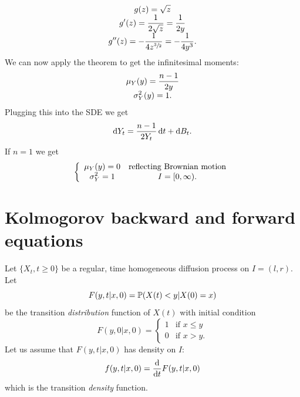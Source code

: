 \documentclass[12pt]{report}
\begin{document}
\begin{enumerate}
\begin{equation*}
\begin{array}{>{\displaystyle}c}
			g(z)=\sqrt{z}\\
			g'(z)=\frac{1}{2\sqrt{z}}=\frac{1}{2y}\\
			g''(z)=-\frac{1}{4z^{\sfrac{3}{2}}}=-\frac{1}{4y^{3}}.
		\end{array}
	\end{equation*}
	We can now apply the theorem to get the infinitesimal moments:
	\begin{equation*}
		\begin{array}{>{\displaystyle}c}
			\mu_{Y}(y)=\frac{n-1}{2y}\\
			\sigma^{2}_{Y}(y)=1.
		\end{array}
	\end{equation*}
	Plugging this into the SDE we get
	\begin{equation*}
		\mathop{}\!\mathrm{d} Y_{t}=\frac{n-1}{2Y_{t}}\mathop{}\!\mathrm{d} t+\mathop{}\!\mathrm{d} B_{t}.
	\end{equation*}
	If $n=1$ we get
	\begin{equation*}
		\left\{\begin{array}{*2{>{\displaystyle}c}}
			\mu_{Y}(y)=0&\text{reflecting \bwm}\\
			\sigma^{2}_{Y}=1&I=[0,\infty).
		\end{array}\right.
	\end{equation*}
\end{enumerate}
\section{Kolmogorov backward and forward equations}
Let $\{X_{t},t\geq 0\}$ be a regular, time homogeneous diffusion process on $I=(l,r)$. Let
\begin{equation*}
	F(y,t|x,0)=\mathbb{P}(X(t)<y|X(0)=x)
\end{equation*}
be the transition \textit{distribution} function of $X(t)$ with initial condition
\begin{equation*}
	F(y,0|x,0)=\begin{cases}
		1&\text{if }x\leq y\\
		0&\text{if }x>y.
	\end{cases}
\end{equation*}
Let us assume that $F(y,t|x,0)$ has density on $I$:
\begin{equation*}
	f(y,t|x,0)=\frac{\mathop{}\!\mathrm{d}}{\mathop{}\!\mathrm{d} t}F(y,t|x,0)
\end{equation*}
which is the transition \textit{density} function.
\end{document}
